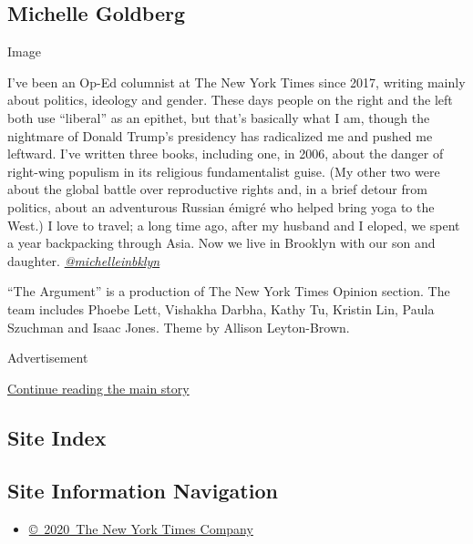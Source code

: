 \hypertarget{michelle-goldberg}{%
\subsection{Michelle Goldberg}\label{michelle-goldberg}}

Image

I've been an Op-Ed columnist at The New York Times since 2017, writing
mainly about politics, ideology and gender. These days people on the
right and the left both use ``liberal'' as an epithet, but that's
basically what I am, though the nightmare of Donald Trump's presidency
has radicalized me and pushed me leftward. I've written three books,
including one, in 2006, about the danger of right-wing populism in its
religious fundamentalist guise. (My other two were about the global
battle over reproductive rights and, in a brief detour from politics,
about an adventurous Russian émigré who helped bring yoga to the West.)
I love to travel; a long time ago, after my husband and I eloped, we
spent a year backpacking through Asia. Now we live in Brooklyn with our
son and daughter.
\href{https://twitter.com/michelleinbklyn}{\emph{@michelleinbklyn}}

``The Argument'' is a production of The New York Times Opinion section.
The team includes Phoebe Lett, Vishakha Darbha, Kathy Tu, Kristin Lin,
Paula Szuchman and Isaac Jones. Theme by Allison Leyton-Brown.

Advertisement

\protect\hyperlink{after-bottom}{Continue reading the main story}

\hypertarget{site-index}{%
\subsection{Site Index}\label{site-index}}

\hypertarget{site-information-navigation}{%
\subsection{Site Information
Navigation}\label{site-information-navigation}}

\begin{itemize}
\tightlist
\item
  \href{https://help.nytimes3xbfgragh.onion/hc/en-us/articles/115014792127-Copyright-notice}{©~2020~The
  New York Times Company}
\end{itemize}

